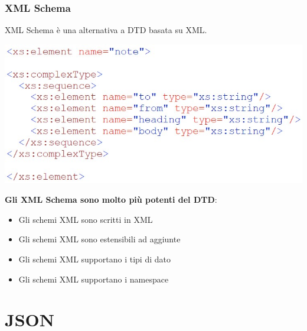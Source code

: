 \subsection{XML Schema}
XML Schema è una alternativa a DTD basata su XML.
\begin{center}
    \includegraphics[scale=0.4]{Images/TecnologieWeb/5/Scherma.jpg}
\end{center}
\textbf{Gli XML Schema sono molto più potenti del DTD}:
\begin{itemize}
    \item Gli schemi XML sono scritti in XML
    \item Gli schemi XML sono estensibili ad aggiunte
    \item Gli schemi XML supportano i tipi di dato
    \item Gli schemi XML supportano i namespace
\end{itemize}



\chapter{JSON}
